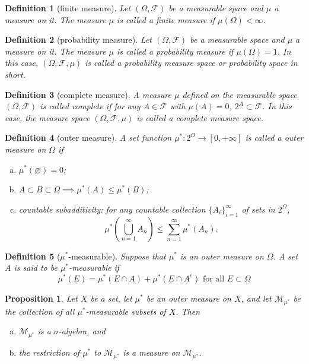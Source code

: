 \documentclass{report}
\newtheorem{definition}{Definition}[section]
\newtheorem{proposition}{Proposition}[section]
\theoremstyle{nonumberplain}
\begin{document}
\begin{definition}[finite measure]
	Let $(\Omega,{\mathcal {F}})$ be a measurable space and $\mu$ a measure on it. The measure $\mu$ is called a \emph{finite measure} if $\mu(\Omega)<\infty$.
\end{definition}

\begin{definition}[probability measure]
	Let $(\Omega,{\mathcal {F}})$ be a measurable space and $\mu$ a measure on it. The measure $\mu$ is called a \emph{probability measure} if $\mu(\Omega)=1$. In this case, $(\Omega,{\mathcal {F}},\mu)$ is called a \emph{probability measure space} or \emph{probability space} in short.
\end{definition}

\begin{definition}[complete measure]
	A measure $\mu$ defined on the measurable space $(\Omega,\mathcal{F})$ is called \emph{complete} if for any $A \in \mathcal{F}$ with $\mu(A) = 0$, $2^A \subset \mathcal{F}$. In this case, the measure space $(\Omega,\mathcal{F},\mu)$ is called a complete measure space. 
\end{definition}

\begin{definition}[outer measure]
	A set function $\mu^*:2^\Omega\to[0,+\infty]$  is called a \emph{outer measure} on $\Omega$ if
	\begin{enumerate}[(a)]
		\item $\mu^*(\varnothing) = 0$;
		\item $A\subset B\subset\Omega\implies\mu^*(A) \le\mu^*(B)$;
		\item countable subadditivity: for any countable collection $\{A_{i}\}_{i=1}^{\infty }$ of sets in $2^\Omega$,
		\[
		\mu^*\left(\bigcup_{n=1}^\infty A_n\right)\le\sum_{n=1}^{\infty}\mu^*(A_n).
		\]
	\end{enumerate}
\end{definition}

\begin{definition}[$\mu^{*}$-measurable]
	Suppose that $\mu^*$ is an outer measure on $\Omega$. A set $A$ is said to be \emph{$\mu^{*}$-measurable} if
	\[
	\mu^{*}(E)=\mu^{*}(E \cap A)+\mu^{*}\left(E \cap A^{c}\right) \text { for all } E \subset \Omega
	\]
\end{definition}

\begin{proposition}
	Let $X$ be a set, let $\mu^{*}$ be an outer measure on $X$, and let $\mathcal{M}_{\mu^{*}}$ be the collection of all $\mu^{*}$-measurable subsets of $X$. Then
	\begin{enumerate}[(a)]
		\item $\mathcal{M}_{\mu^{*}}$ is a $\sigma$-algebra, and
		\item the restriction of $\mu^{*}$ to $\mathcal{M}_{\mu^{*}}$ is a measure on $\mathcal{M}_{\mu^{*}}$.
	\end{enumerate}
\end{proposition}
\end{document}
